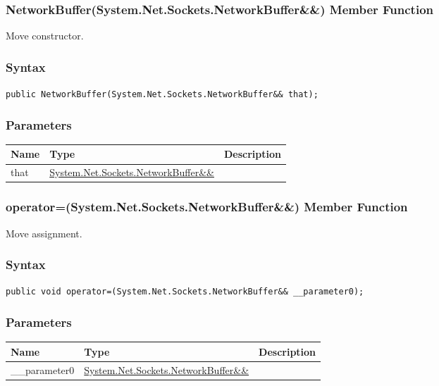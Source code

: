 \documentclass[a4paper,oneside,11.000000pt]{book}
\begin{document}
\hypertarget{System.Net.Sockets.NetworkBuffer.constructor.P.System.Net.Sockets.NetworkBuffer.RR.System.Net.Sockets.NetworkBuffer}{\subsubsection*{NetworkBuffer(System.Net.Sockets.NetworkBuffer\&\&) Member Function}}\begin{flushleft}
Move constructor.

\end{flushleft}
\subsubsection*{Syntax}
\texttt{public NetworkBuffer(System.Net.Sockets.NetworkBuffer\&\& that);}
\subsubsection*{Parameters}
\begin{flushleft}
\begin{supertabular}[l]{!{\raggedright}p{1.30721cm}!{\raggedright}p{8.55945cm}!{\raggedright}p{2.65538cm}}
\textbf{Name}
& \textbf{Type}
& \textbf{Description}
\\
\hline
that
& \hyperlink{System.Net.Sockets.NetworkBuffer}{System.\-Net.\-Sockets.\-NetworkBuffer\&\-\&\-}
& 
\\
\end{supertabular}

\end{flushleft}
\clearpage

\hypertarget{System.Net.Sockets.NetworkBuffer.operator.assign.P.System.Net.Sockets.NetworkBuffer.RR.System.Net.Sockets.NetworkBuffer}{\subsubsection*{operator=(System.Net.Sockets.NetworkBuffer\&\&) Member Function}}\begin{flushleft}
Move assignment.

\end{flushleft}
\subsubsection*{Syntax}
\texttt{public void operator=(System.Net.Sockets.NetworkBuffer\&\& \_\_parameter0);}
\subsubsection*{Parameters}
\begin{flushleft}
\begin{supertabular}[l]{!{\raggedright}p{2.61335cm}!{\raggedright}p{7.25332cm}!{\raggedright}p{2.65538cm}}
\textbf{Name}
& \textbf{Type}
& \textbf{Description}
\\
\hline
\_\_parameter0
& \hyperlink{System.Net.Sockets.NetworkBuffer}{System.\-Net.\-Sockets.\-NetworkBuffer\&\-\&\-}
& 
\\
\end{supertabular}

\end{flushleft}
\clearpage
\end{document}
